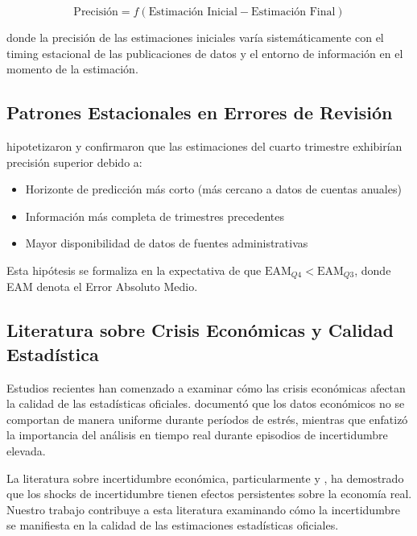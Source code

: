 \documentclass[12pt,a4paper]{article}
\begin{document}
\begin{equation}
\text{Precisión} = f(\text{Estimación Inicial} - \text{Estimación Final})
\end{equation}

donde la precisión de las estimaciones iniciales varía sistemáticamente con el timing estacional de las publicaciones de datos y el entorno de información en el momento de la estimación.

\subsection{Patrones Estacionales en Errores de Revisión}

\citet{pavia2017} hipotetizaron y confirmaron que las estimaciones del cuarto trimestre exhibirían precisión superior debido a:

\begin{itemize}
\item Horizonte de predicción más corto (más cercano a datos de cuentas anuales)
\item Información más completa de trimestres precedentes  
\item Mayor disponibilidad de datos de fuentes administrativas
\end{itemize}

Esta hipótesis se formaliza en la expectativa de que $\text{EAM}_{Q4} < \text{EAM}_{Q3}$, donde EAM denota el Error Absoluto Medio.

\subsection{Literatura sobre Crisis Económicas y Calidad Estadística}

Estudios recientes han comenzado a examinar cómo las crisis económicas afectan la calidad de las estadísticas oficiales. \citet{aruoba2008} documentó que los datos económicos no se comportan de manera uniforme durante períodos de estrés, mientras que \citet{croushore2011} enfatizó la importancia del análisis en tiempo real durante episodios de incertidumbre elevada.

La literatura sobre incertidumbre económica, particularmente \citet{bloom2009} y \citet{baker2016}, ha demostrado que los shocks de incertidumbre tienen efectos persistentes sobre la economía real. Nuestro trabajo contribuye a esta literatura examinando cómo la incertidumbre se manifiesta en la calidad de las estimaciones estadísticas oficiales.
\end{document}
